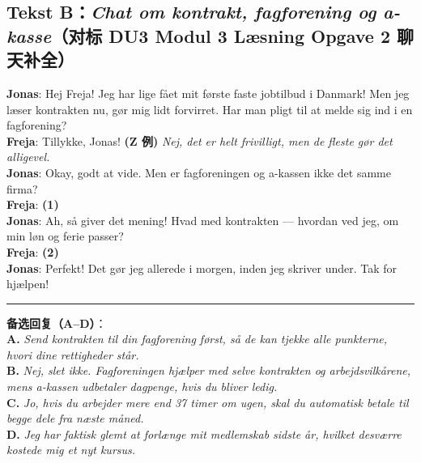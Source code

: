 \subsection*{Tekst B：\textit{Chat om kontrakt, fagforening og a-kasse}（对标 DU3 Modul 3 Læsning Opgave 2 聊天补全）}

\begin{tcolorbox}[enhanced, breakable, colback=NCDBgBlue, colframe=NCDNavy, coltitle=white, fonttitle=\bfseries, title={同事聊天气泡补全（请从下方 A--D 中选出 2 句填入 \textbf{(1)} 和 \textbf{(2)}，有 2 项多余）}, arc=2pt, boxrule=0.8pt, left=10pt, right=10pt, top=7pt, bottom=7pt]
\small
\textbf{Jonas}: Hej Freja! Jeg har lige fået mit første faste jobtilbud i Danmark! Men jeg læser kontrakten nu,  gør mig lidt forvirret. Har man pligt til at melde sig ind i en fagforening?\\[3pt]
\textbf{Freja}: Tillykke, Jonas! \textbf{(Z 例)} \textit{Nej, det er helt frivilligt, men de fleste gør det alligevel.}\\[3pt]
\textbf{Jonas}: Okay, godt at vide. Men er fagforeningen og a-kassen ikke det samme firma?\\[3pt]
\textbf{Freja}: \textbf{(1)} \underline{\hspace{5.5cm}}\\[3pt]
\textbf{Jonas}: Ah, så giver det mening! Hvad med kontrakten --- hvordan ved jeg, om min løn og ferie passer?\\[3pt]
\textbf{Freja}: \textbf{(2)} \underline{\hspace{5.5cm}}\\[3pt]
\textbf{Jonas}: Perfekt! Det gør jeg allerede i morgen, inden jeg skriver under. Tak for hjælpen!

\vspace{0.4em}
\hrule
\vspace{0.35em}
\textbf{备选回复（A--D）}：\\
\textbf{A.} \textit{Send kontrakten til din fagforening først, så de kan tjekke alle punkterne, hvori dine rettigheder står.}\\
\textbf{B.} \textit{Nej, slet ikke. Fagforeningen hjælper med selve kontrakten og arbejdsvilkårene, mens a-kassen udbetaler dagpenge, hvis du bliver ledig.}\\
\textbf{C.} \textit{Jo, hvis du arbejder mere end 37 timer om ugen, skal du automatisk betale til begge dele fra næste måned.}\\
\textbf{D.} \textit{Jeg har faktisk glemt at forlænge mit medlemskab sidste år, hvilket desværre kostede mig et nyt kursus.}
\end{tcolorbox}

